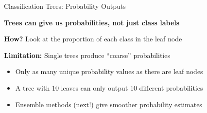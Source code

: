 \documentclass[10pt]{beamer}
\newcommand{\highlight}[1]{\textcolor{AccentOrange}{\textbf{#1}}}
\begin{document}
\begin{frame}{Classification Trees: Probability Outputs}

  \highlight{Trees can give us probabilities, not just class labels}

  \vspace{1em}
  \textbf{How?} Look at the proportion of each class in the leaf node

  \vspace{1em}
  \begin{center}
  \end{center}

  \vspace{1em}
  \textbf{Limitation:} Single trees produce ``coarse'' probabilities
  \begin{itemize}
    \item Only as many unique probability values as there are leaf nodes
    \item A tree with 10 leaves can only output 10 different probabilities
    \item Ensemble methods (next!) give smoother probability estimates
  \end{itemize}
\end{frame}

\end{document}
